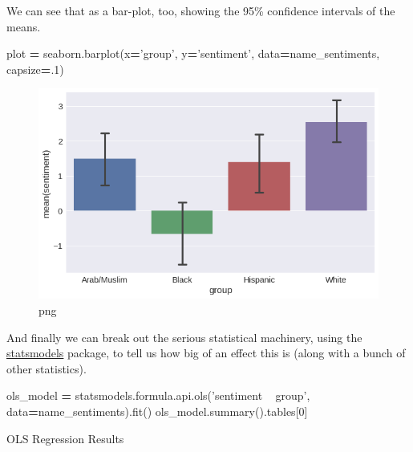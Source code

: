 \documentclass[]{book}
\newenvironment{Shaded}{\begin{snugshade}}{\end{snugshade}}
\newcommand{\DecValTok}[1]{\textcolor[rgb]{0.00,0.00,0.81}{#1}}
\newcommand{\StringTok}[1]{\textcolor[rgb]{0.31,0.60,0.02}{#1}}
\newcommand{\OperatorTok}[1]{\textcolor[rgb]{0.81,0.36,0.00}{\textbf{#1}}}
\newcommand{\NormalTok}[1]{#1}
\theoremstyle{definition}
\theoremstyle{definition}
\theoremstyle{definition}
\theoremstyle{remark}
\begin{document}
We can see that as a bar-plot, too, showing the 95\% confidence
intervals of the means.

\begin{Shaded}
\begin{Highlighting}[]
\NormalTok{plot }\OperatorTok{=}\NormalTok{ seaborn.barplot(x}\OperatorTok{=}\StringTok{'group'}\NormalTok{, y}\OperatorTok{=}\StringTok{'sentiment'}\NormalTok{, data}\OperatorTok{=}\NormalTok{name_sentiments, capsize}\OperatorTok{=}\NormalTok{.}\DecValTok{1}\NormalTok{)}
\end{Highlighting}
\end{Shaded}

\begin{figure}
\centering
\includegraphics{how-to-make-a-racist-ai-without-really-trying_files/how-to-make-a-racist-ai-without-really-trying_52_0.png}
\caption{png}
\end{figure}

And finally we can break out the serious statistical machinery, using
the \href{http://www.statsmodels.org/stable/index.html}{statsmodels}
package, to tell us how big of an effect this is (along with a bunch of
other statistics).

\begin{Shaded}
\begin{Highlighting}[]
\NormalTok{ols_model }\OperatorTok{=}\NormalTok{ statsmodels.formula.api.ols(}\StringTok{'sentiment ~ group'}\NormalTok{, data}\OperatorTok{=}\NormalTok{name_sentiments).fit()}
\NormalTok{ols_model.summary().tables[}\DecValTok{0}\NormalTok{]}
\end{Highlighting}
\end{Shaded}

OLS Regression Results
\end{document}

